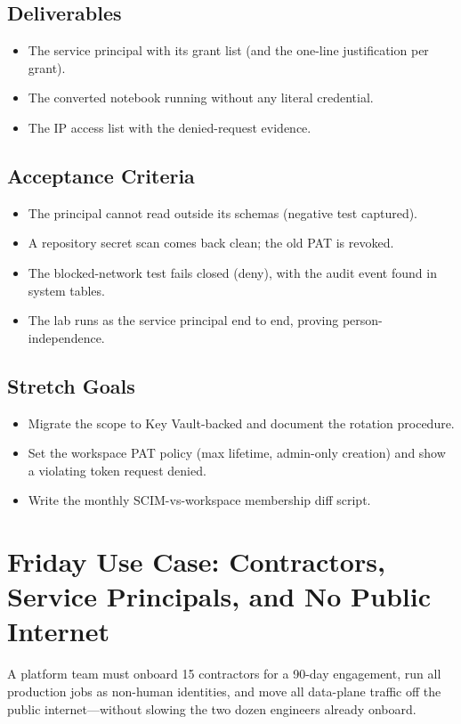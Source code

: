 \subsection*{Deliverables}
\begin{itemize}
    \item The service principal with its grant list (and the one-line justification per grant).
    \item The converted notebook running without any literal credential.
    \item The IP access list with the denied-request evidence.
\end{itemize}

\subsection*{Acceptance Criteria}
\begin{itemize}
    \item The principal cannot read outside its schemas (negative test captured).
    \item A repository secret scan comes back clean; the old PAT is revoked.
    \item The blocked-network test fails closed (deny), with the audit event found in system tables.
    \item The lab runs as the service principal end to end, proving person-independence.
\end{itemize}

\subsection*{Stretch Goals}
\begin{itemize}
    \item Migrate the scope to Key Vault-backed and document the rotation procedure.
    \item Set the workspace PAT policy (max lifetime, admin-only creation) and show a violating token request denied.
    \item Write the monthly SCIM-vs-workspace membership diff script.
\end{itemize}

\section{Friday Use Case: Contractors, Service Principals, and No Public Internet}
A platform team must onboard 15 contractors for a 90-day engagement, run all production jobs as non-human identities, and move all data-plane traffic off the public internet---without slowing the two dozen engineers already onboard.

